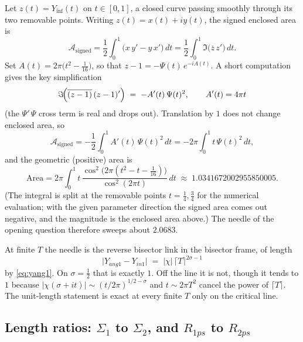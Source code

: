 \documentclass[11pt]{article}
\theoremstyle{definition}
\begin{document}
Let $z(t)=Y_{\inf}(t)$ on $t\in[0,1]$, a closed curve passing smoothly through
its two removable points. Writing $z(t)=x(t)+iy(t)$, the signed enclosed area
is
\begin{equation}\label{eq:area-def}
\mathcal A_{\mathrm{signed}}
=\frac12\int_{0}^{1}\bigl(x\,y'-y\,x'\bigr)\,dt
=\frac12\int_{0}^{1}\Im\!\bigl(\overline{z}\,z'\bigr)\,dt .
\end{equation}
Set $A(t)=2\pi\bigl(t^{2}-\tfrac{1}{16}\bigr)$, so that
$z-1=-\Psi(t)\,e^{-iA(t)}$. A short computation gives the key simplification
\begin{equation}\label{eq:area-key}
\Im\!\Bigl(\overline{(z-1)}\,(z-1)'\Bigr)
\;=\;
-A'(t)\,\Psi(t)^{2},
\qquad A'(t)=4\pi t
\end{equation}
(the $\Psi'\,\Psi$ cross term is real and drops out). Translation by $1$ does
not change enclosed area, so
\begin{equation}\label{eq:area-signed}
\mathcal A_{\mathrm{signed}}
=-\frac12\int_{0}^{1}A'(t)\,\Psi(t)^{2}\,dt
=-2\pi\int_{0}^{1}t\,\Psi(t)^{2}\,dt ,
\end{equation}
and the geometric (positive) area is
\begin{equation}\label{eq:area-value}
\boxed{\;
\mathrm{Area}
=2\pi\int_{0}^{1}t\,
\frac{\cos^{2}\!\bigl(2\pi(t^{2}-t-\tfrac{1}{16})\bigr)}{\cos^{2}(2\pi t)}
\,dt
\;\approx\;
1.0341672002955850005 .\;}
\end{equation}
(The integral is split at the removable points $t=\tfrac14,\tfrac34$ for the
numerical evaluation; with the given parameter direction the signed area comes
out negative, and the magnitude is the enclosed area above.) The needle of the
opening question therefore sweeps about $2.0683$.

At finite $T$ the needle is the reverse bisector link in the bisector
frame, of length
\begin{equation}\label{eq:needle-length}
\lvert Y_{ang1}-Y_{in1}\rvert
\;=\;
\lvert\chi\rvert\,\lceil T\rceil^{2\sigma-1}
\end{equation}
by \eqref{eq:yang1}.
On $\sigma=\tfrac12$ that is exactly $1$. Off the line it is not,
though it tends to $1$ because
$\lvert\chi(\sigma+it)\rvert\sim(t/2\pi)^{1/2-\sigma}$
and $t\sim 2\pi T^{2}$ cancel the power of $\lceil T\rceil$.
The unit-length statement is exact at every finite $T$ only on the
critical line.

\subsection{\texorpdfstring{Length ratios: $\Sigma_1$ to $\Sigma_2$, and $R_{1ps}$ to $R_{2ps}$}{Length ratios}}\label{sec:length-ratios}
\end{document}
